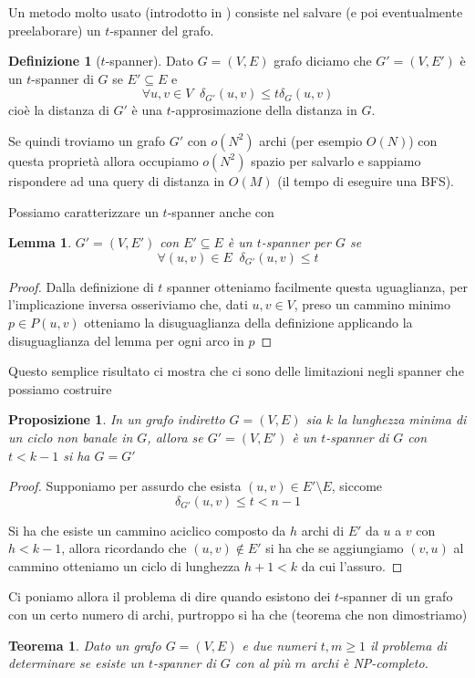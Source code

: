 \documentclass[a4paper,10pt]{amsbook}
\newcounter{counter1}
\theoremstyle{plain}
\newtheorem{myteo}[counter1]{Teorema}
\newtheorem{mylem}[counter1]{Lemma}
\newtheorem{mypro}[counter1]{Proposizione}
\theoremstyle{definition}
\newtheorem{mydef}[counter1]{Definizione}
\theoremstyle{remark}
\newcommand{\pa}[1]{\left(#1\right)}
\begin{document}
Un metodo molto usato (introdotto in \cite{graphspanners}) consiste
nel salvare (e poi eventualmente preelaborare) un $t$-spanner del
grafo.

\begin{mydef}[$t$-spanner]
  Dato $G = (V,E)$ grafo diciamo che $G' = (V, E')$ \`e un $t$-spanner
  di $G$ se $E' \subseteq E$ e
  \[ \forall u,v \in V \;\; \delta _{G'} \pa{ u,v} \le t \delta _{G}
    \pa{ u,v} \]
  cio\`e la distanza di $G'$ \`e una $t$-approsimazione della distanza
  in $G$.
\end{mydef}

Se quindi troviamo un grafo $G'$ con $o\pa{ N^2}$ archi (per esempio
$O(N)$) con questa propriet\`a allora occupiamo $o(N^2)$
spazio per salvarlo e sappiamo rispondere ad una query di distanza in
$O(M)$ (il tempo di eseguire una BFS).

Possiamo caratterizzare un $t$-spanner anche con
\begin{mylem}
  $G' = (V,E')$ con $E' \subseteq E$ \`e un $t$-spanner per $G$ se
  \[ \forall (u,v) \in E\;\; \delta_{G'} (u,v) \le t \]
\end{mylem}
\begin{proof}
  Dalla definizione di $t$ spanner otteniamo facilmente questa
  uguaglianza, per l'implicazione inversa osseriviamo che, dati $u,v
  \in V$, preso un cammino minimo $p \in P(u,v)$ otteniamo la
  disuguaglianza della definizione applicando la disuguaglianza del
  lemma per ogni arco in $p$
\end{proof}

Questo semplice risultato ci mostra che ci sono delle limitazioni
negli spanner che possiamo costruire
\begin{mypro}
  In un grafo indiretto $G = (V,E)$ sia $k$ la lunghezza minima di un
  ciclo non banale in $G$, allora se $G' = (V,E')$ \`e un $t$-spanner
  di $G$ con $t < k-1$ si ha $G = G'$
\end{mypro}
\begin{proof}
  Supponiamo per assurdo che esista $(u,v) \in E' \setminus E$,
  siccome
  \[ \delta_{G'} (u,v) \le t < n -1 \] 

  Si ha che esiste un cammino aciclico composto da $h$ archi di $E'$
  da $u$ a $v$ con $h<k-1$, allora ricordando che $(u,v) \not\in E'$
  si ha che se aggiungiamo $(v,u)$ al cammino otteniamo un ciclo di
  lunghezza $h+1 < k$ da cui l'assuro.
\end{proof}

Ci poniamo allora il problema di dire quando esistono dei $t$-spanner
di un grafo con un certo numero di archi, purtroppo si ha che (teorema
che non dimostriamo)
\begin{myteo}
  Dato un grafo $G = (V,E)$ e due numeri $t,m\ge 1$ il problema di
  determinare se esiste un $t$-spanner di $G$ con al pi\`u $m$ archi
  \`e NP-completo.
\end{myteo}
\end{document}
